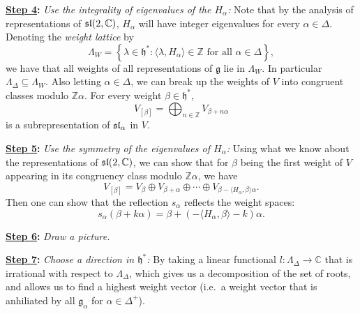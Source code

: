 \documentclass{report}
\begin{document}
{\bf \underline{Step 4}:} \emph{Use the integrality of eigenvalues of the  $H_\alpha$:}
Note that by the analysis of representations of $\operatorname{{\mathfrak{sl}}}(2, \mathbb C)$, $H_\alpha$ will have integer eigenvalues for every $\alpha \in \Delta$.
Denoting the \emph{weight lattice} by
\[
\Lambda_W = \left\{ \lambda \in \mathfrak h^*: \langle \lambda, H_\alpha \rangle \in \mathbb Z \text{ for all } \alpha \in \Delta \right\},
\]
we have that all weights of all representations of $\mathfrak g$ lie in $\Lambda_W$.
In particular $\Lambda_\Delta \subseteq \Lambda_W$.
Also letting $\alpha \in \Delta$, we can break up the weights of $V$ into congruent classes modulo $\mathbb Z \alpha$.
For every weight $\beta \in \mathfrak h^*$,
\[
V_{[\beta]} = \bigoplus_{n \in \mathbb Z} V_{\beta + n\alpha}
\]
is a subrepresentation of $\operatorname{{\mathfrak{sl}}}_\alpha$ in $V$.

{\bf \underline{Step 5}:} \emph{Use the symmetry of the eigenvalues of $H_\alpha$:}
Using what we know about the representations of $\operatorname{{\mathfrak{sl}}}(2,\mathbb C)$, we can show that for $\beta$ being the first weight of $V$ appearing in its congruency class modulo $\mathbb Z \alpha$, we have 
\[
V_{[\beta]} = V_{\beta} \oplus V_{\beta + \alpha} \oplus \cdots \oplus V_{\beta - \langle H_\alpha, \beta \rangle \alpha}.
\]
Then one can show that the reflection $s_\alpha$ reflects the weight spaces:
\[
s_\alpha (\beta + k \alpha) = \beta + (-\langle H_\alpha, \beta \rangle - k) \alpha.
\]

{\bf \underline{Step 6}:} \emph{Draw a picture.}

{\bf \underline{Step 7}:} \emph{Choose a direction in $\mathfrak h^*$:}
By taking a linear functional $l:\Lambda_\Delta \to \mathbb C$ that is irrational with respect to $\Lambda_\Delta$, which gives us a decomposition of the set of roots, and allows us to find a highest weight vector (i.e.\ a weight vector that is anhiliated by all $\mathfrak g_\alpha$ for $\alpha \in \Delta^+$).
\end{document}
